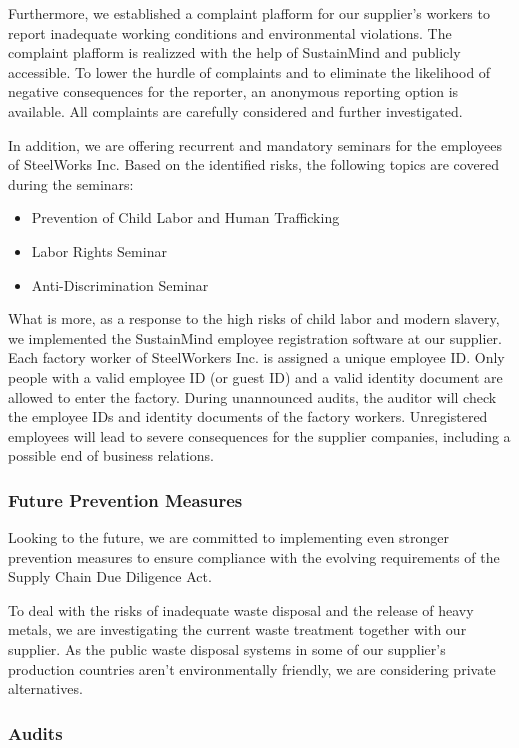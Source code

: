 \documentclass{article}
\begin{document}
Furthermore, we established a complaint plafform for our supplier's workers to report inadequate working conditions and environmental violations. The complaint plafform
is realizzed with the help of SustainMind and publicly accessible. To lower the hurdle of complaints and to eliminate the likelihood of negative consequences for the reporter,
an anonymous reporting option is available. All complaints are carefully considered and further investigated.

In addition, we are offering recurrent and mandatory seminars for the employees of SteelWorks Inc. Based on the identified risks, the following topics are covered during
the seminars:
\begin{itemize}
    \item Prevention of Child Labor and Human Trafficking
    \item Labor Rights Seminar
    \item Anti-Discrimination Seminar
\end{itemize}

What is more, as a response to the high risks of child labor and modern slavery, we implemented the SustainMind employee registration software at our supplier.
Each factory worker of SteelWorkers Inc. is assigned a unique employee ID. Only people with a valid employee ID (or guest ID) and a valid identity document are
allowed to enter the factory. During unannounced audits, the auditor will check the employee IDs and identity documents of the factory workers. Unregistered employees
will lead to severe consequences for the supplier companies, including a possible end of business relations.

\subsubsection*{Future Prevention Measures}

Looking to the future, we are committed to implementing even stronger prevention measures to ensure compliance with the evolving requirements of the Supply Chain
Due Diligence Act.

To deal with the risks of inadequate waste disposal and the release of heavy metals, we are investigating the current waste treatment together with our supplier.
As the public waste disposal systems in some of our supplier's production countries aren't environmentally friendly, we are considering private alternatives.

\subsubsection*{Audits}
\end{document}
